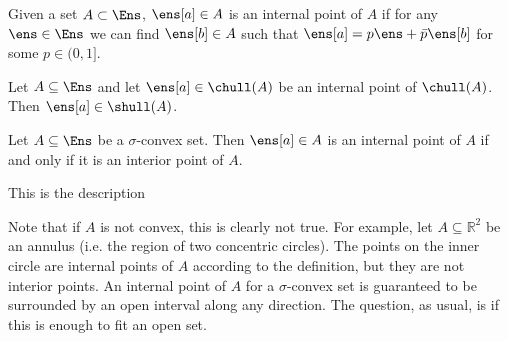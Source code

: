 \begin{defn}
	Given a set $A \subset \Ens$, $\ens[a] \in A$ is an internal point of $A$ if for any $\ens \in \Ens$ we can find $\ens[b] \in A$ such that $\ens[a] = p \ens + \bar{p} \ens[b]$ for some $p \in (0,1]$.
\end{defn}

\begin{conj}
	 Let $A \subseteq \Ens$ and let $\ens[a] \in \chull(A)$ be an internal point of $\chull(A)$. Then $\ens[a] \in \shull(A)$.
\end{conj}

\begin{conj}\label{interiorIsInternal}
	Let $A \subseteq \Ens$ be a $\sigma$-convex set. Then $\ens[a] \in A$ is an internal point of $A$ if and only if it is an interior point of $A$.
\end{conj}

{This is the description}

\begin{remark}
	Note that if $A$ is not convex, this is clearly not true. For example, let $A \subseteq \mathbb{R}^2$ be an annulus (i.e. the region of two concentric circles). The points on the inner circle are internal points of $A$ according to the definition, but they are not interior points. An internal point of $A$ for a $\sigma$-convex set is guaranteed to be surrounded by an open interval along any direction. The question, as usual, is if this is enough to fit an open set.
\end{remark}
